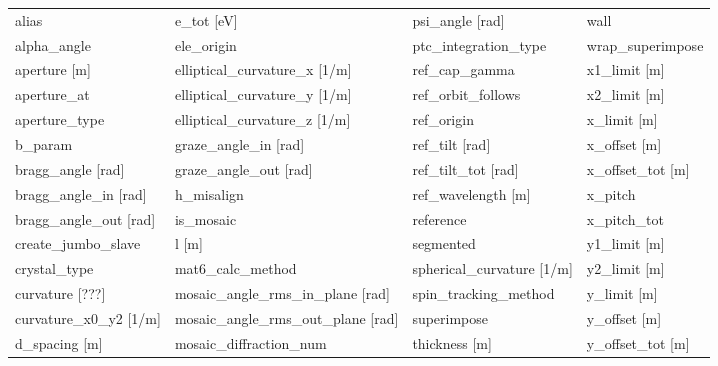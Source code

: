  \begin{tabular}{llll} \toprule
alias                            & e_tot [eV]                       & psi_angle [rad]                  & wall                             \\
alpha_angle                      & ele_origin                       & ptc_integration_type             & wrap_superimpose                 \\
aperture [m]                     & elliptical_curvature_x [1/m]     & ref_cap_gamma                    & x1_limit [m]                     \\
aperture_at                      & elliptical_curvature_y [1/m]     & ref_orbit_follows                & x2_limit [m]                     \\
aperture_type                    & elliptical_curvature_z [1/m]     & ref_origin                       & x_limit [m]                      \\
b_param                          & graze_angle_in [rad]             & ref_tilt [rad]                   & x_offset [m]                     \\
bragg_angle [rad]                & graze_angle_out [rad]            & ref_tilt_tot [rad]               & x_offset_tot [m]                 \\
bragg_angle_in [rad]             & h_misalign                       & ref_wavelength [m]               & x_pitch                          \\
bragg_angle_out [rad]            & is_mosaic                        & reference                        & x_pitch_tot                      \\
create_jumbo_slave               & l [m]                            & segmented                        & y1_limit [m]                     \\
crystal_type                     & mat6_calc_method                 & spherical_curvature [1/m]        & y2_limit [m]                     \\
curvature [???]                  & mosaic_angle_rms_in_plane [rad]  & spin_tracking_method             & y_limit [m]                      \\
curvature_x0_y2 [1/m]            & mosaic_angle_rms_out_plane [rad] & superimpose                      & y_offset [m]                     \\
d_spacing [m]                    & mosaic_diffraction_num           & thickness [m]                    & y_offset_tot [m]                 \\

\end{tabular}
